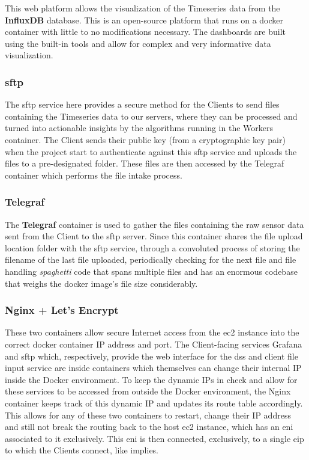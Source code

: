 This web platform allows the visualization of the Timeseries data from the \textbf{InfluxDB} database. This is an open-source platform that runs on a docker container with little to no modifications necessary. The dashboards are built using the built-in tools and allow for complex and very informative data visualization. 

\subsubsection{\gls{sftp}}\label{methodology:sss:sftp}

The \gls{sftp} service here provides a secure method for the Clients to send files containing the Timeseries data to our servers, where they can be processed and turned into actionable insights by the algorithms running in the Workers container. The Client sends their public key (from a cryptographic key pair) when the project start to authenticate against this \gls{sftp} service and uploads the files to a pre-designated folder. These files are then accessed by the Telegraf container which performs the file intake process.

\subsubsection{Telegraf}\label{methodology:sss:telegraf}

The \textbf{Telegraf} container is used to gather the files containing the raw sensor data sent from the Client to the \gls{sftp} server. Since this container shares the file upload location folder with the \gls{sftp} service, through a convoluted process of storing the filename of the last file uploaded, periodically checking for the next file and file handling \textit{spaghetti} code that spans multiple files and has an enormous codebase that weighs the docker image's file size considerably. 


\subsubsection{Nginx + Let's Encrypt}\label{methodology:sss:nginxletsencrypt}

These two containers allow secure Internet access from the \gls{ec2} instance into the correct docker container IP address and port. The Client-facing services Grafana and \gls{sftp} which, respectively, provide the web interface for the \gls{dss} and client file input service are inside containers which themselves can change their internal IP inside the Docker environment. To keep the dynamic IPs in check and allow for these services to be accessed from outside the Docker environment, the Nginx container keeps track of this dynamic IP and updates its route table accordingly. This allows for any of these two containers to restart, change their IP address and still not break the routing back to the host \gls{ec2} instance, which has an \gls{eni} associated to it exclusively. This \gls{eni} is then connected, exclusively, to a single \gls{eip} to which the Clients connect, like  implies.

